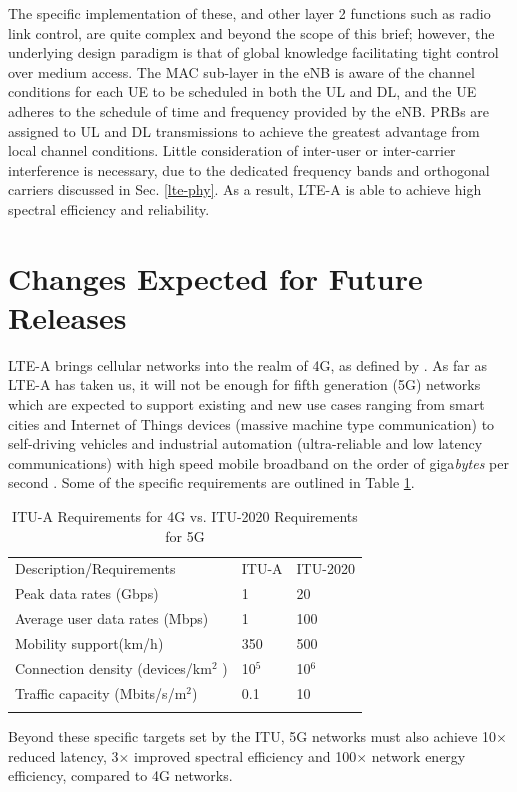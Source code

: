 The specific implementation of these, and other layer 2 functions such as radio link control, are quite complex and beyond the scope of this brief; however, the underlying design paradigm is that of global knowledge facilitating tight control over medium access. The MAC sub-layer in the eNB is aware of the channel conditions for each UE to be scheduled in both the UL and DL, and the UE adheres to the schedule of time and frequency provided by the eNB.  PRBs are assigned to UL and DL transmissions to achieve the greatest advantage from local channel conditions. Little consideration of inter-user or inter-carrier interference is necessary, due to the dedicated frequency bands and orthogonal carriers discussed in Sec. \ref{lte-phy}.  As a result, \mbox{LTE-A} is able to achieve high spectral efficiency and reliability.


\section {Changes Expected for Future Releases}
\label{fut-chnge}
\mbox{LTE-A} brings cellular networks into the realm of 4G, as defined by \cite{itu-advanced}.  As far as \mbox{LTE-A} has taken us, it will not be enough for fifth generation (5G) networks which are expected to support existing and new use cases ranging from smart cities and Internet of Things devices (massive machine type communication) to self-driving vehicles and industrial automation (ultra-reliable and low latency communications) with  high speed mobile broadband on the order of giga\emph{bytes} per second \cite{itu-2020}.  Some of the specific requirements are outlined in Table \ref{5g-table}.
\begin{table}
	\caption{ITU-A Requirements for 4G vs. ITU-2020 Requirements for 5G  \cite{itu-2020}}
	\label{5g-table}      
	\begin{tabular}{p{}p{}p{}}
		\hline\noalign{\smallskip}
		Description/Requirements & ITU-A & ITU-2020  \\
		\noalign{\smallskip}\svhline\noalign{\smallskip}
		Peak data rates (Gbps) & 1  & 20\\
		Average user data rates (Mbps) & 1  & 100  \\				
		Mobility support(km/h) & 350  & 500 \\
		Connection density (devices/km$^2$ )& 10$^5$ & 10$^6$ \\
		Traffic capacity (Mbits/s/m$^2$) & 0.1 & 10 \\
		\noalign{\smallskip}\hline\noalign{\smallskip}
	\end{tabular}
		
\end{table}
Beyond these specific targets set by the ITU, 5G networks must also achieve 10$\times$ reduced latency, 3$\times$ improved spectral efficiency and  100$\times$ network energy efficiency, compared to 4G networks. 

